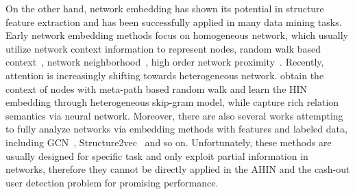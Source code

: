 On the other hand, network embedding has shown its potential in structure feature extraction and has been successfully applied in many data mining tasks. Early network embedding methods focus on homogeneous network, which usually utilize network context information to represent nodes, \eg random walk based context~\citep{Perozzi2014DeepWalk,grover2016node2vec}, network neighborhood~\citep{wang2016structural,Tang2015LINE}, high order network proximity~\citep{Cao2015GraRep}. Recently, attention is increasingly shifting towards heterogeneous network.  \cite{dong2017metapath2vec} obtain the context of nodes with meta-path based random walk and learn the HIN embedding through heterogeneous skip-gram model, while \cite{Fu2017HIN2Vec} capture rich relation semantics via neural network. Moreover, there are also several works attempting to fully analyze networks via embedding methods with features and labeled data, including GCN~\citep{Kipf2016Semi}, Structure2vec~\citep{dai2016discriminative} and so on. Unfortunately, these methods are usually designed for specific task and only exploit partial information in networks, therefore they cannot be directly applied in the AHIN and the cash-out user detection problem for promising performance.